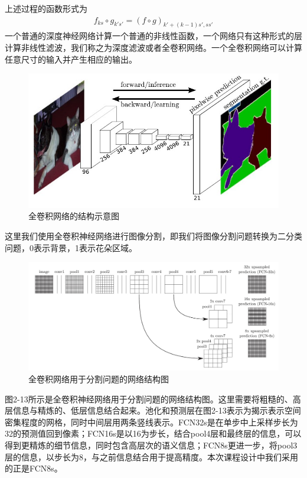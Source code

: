 \documentclass[supercite]{HustGraduPaper}
\begin{document}
\begin{sloppypar}
  上述过程的函数形式为\begin{gather}
    f_{ks}\circ g_{k's'}=(f\circ g)_{k'+(k-1)s',ss'}
  \end{gather}
  一个普通的深度神经网络计算一个普通的非线性函数，一个网络只有这种形式的层计算非线性滤波，我们称之为深度滤波或者全卷积网络\cite{7478072}。一个全卷积网络可以计算任意尺寸的输入并产生相应的输出。\begin{figure}[H]
    \setlength{\abovecaptionskip}{0.2cm}
    \setlength{\belowcaptionskip}{-0.cm}
      \centering%
      \includegraphics[scale=0.8]{15.jpg}
      \caption{全卷积网络的结构示意图}
    \end{figure}

  这里我们使用全卷积神经网络进行图像分割，即我们将图像分割问题转换为二分类问题，0表示背景，1表示花朵区域。\begin{figure}[H]
    \setlength{\abovecaptionskip}{0.2cm}
    \setlength{\belowcaptionskip}{-0.cm}
      \centering%
      \includegraphics[scale=0.42]{18.jpg}
      \caption{全卷积网络用于分割问题的网络结构图}
    \end{figure}

  图2-13所示是全卷积神经网络用于分割问题的网络结构图。这里需要将粗糙的、高层信息与精炼的、低层信息结合起来。池化和预测层在图2-13表示为揭示表示空间密集程度的网格，同时中间层用两条竖线表示。FCN32s是在单步中上采样步长为32的预测值回到像素；FCN16s是以16为步长，结合pool4层和最终层的信息，可以得到更精炼的细节信息，同时包含高层次的语义信息；FCN8s更进一步，将pool3层的信息，以步长为8，与之前信息结合用于提高精度。本次课程设计中我们采用的正是FCN8s。

\end{sloppypar}
\end{document}
